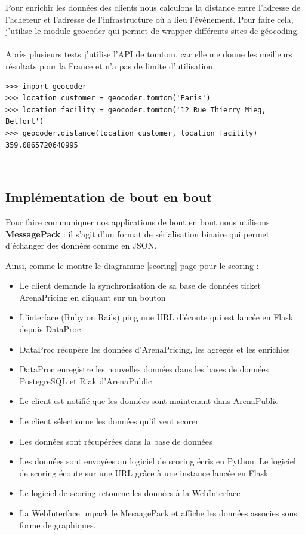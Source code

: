 Pour enrichir les données des clients nous calculons la distance entre l'adresse de l'acheteur et l'adresse de l'infrastructure où a lieu l'événement.
Pour faire cela, j'utilise le module geocoder qui permet de wrapper différents sites de géocoding.
\\ \\
Après plusieurs tests j'utilise l'API de tomtom, car elle me donne les meilleurs résultats pour la France et n'a pas de limite d'utilisation.

\lstset{style=custompython}
\begin{lstlisting}
>>> import geocoder
>>> location_customer = geocoder.tomtom('Paris')
>>> location_facility = geocoder.tomtom('12 Rue Thierry Mieg, Belfort')
>>> geocoder.distance(location_customer, location_facility)
359.0865720640995
\end{lstlisting}
\leavevmode \\

\subsection{Implémentation de bout en bout}
Pour faire communiquer nos applications de bout en bout nous utilisons \textbf{MessagePack} : il s'agit d'un format de sérialisation binaire qui permet d'échanger des données comme en JSON.

Ainsi, comme le montre le diagramme \ref{scoring} page \pageref{scoring} pour le scoring : 

\begin{itemize}
  \item[\textbullet] Le client demande la synchronisation de sa base de données ticket ArenaPricing en cliquant sur un bouton
  \item[\textbullet] L'interface (Ruby on Rails) ping une URL d'écoute qui est lancée en Flask depuis DataProc
  \item[\textbullet] DataProc récupère les données d'ArenaPricing, les agrégés et les enrichies
  \item[\textbullet] DataProc enregistre les nouvelles données dans les bases de données PostegreSQL et Riak d'ArenaPublic
  \item[\textbullet] Le client est notifié que les données sont maintenant dans ArenaPublic
  \item[\textbullet] Le client sélectionne les données qu'il veut scorer
  \item[\textbullet] Les données sont récupérées dans la base de données
  \item[\textbullet] Les données sont envoyées au logiciel de scoring écris en Python. Le logiciel de scoring écoute sur une URL grâce à une instance lancée en Flask
  \item[\textbullet] Le logiciel de scoring retourne les données à la WebInterface
  \item[\textbullet] La WebInterface unpack le MesaagePack et affiche les données associes sous forme de graphiques. 
 

\end{itemize} 

